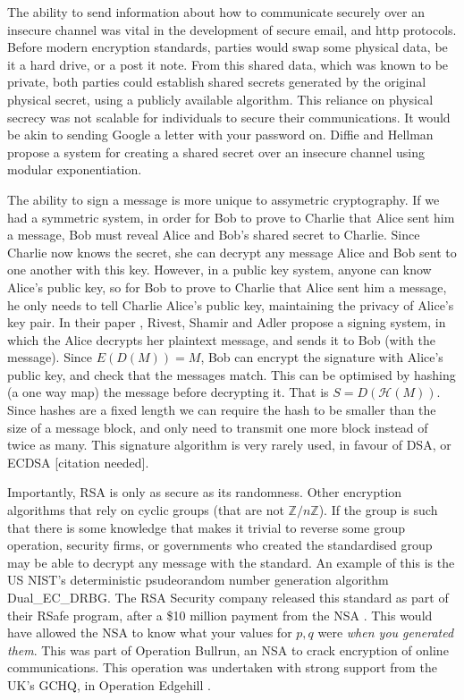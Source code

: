\documentclass{article}
\begin{document}
The ability to send information about how to communicate securely over an
insecure channel was vital in the development of secure email, and http protocols.
Before modern encryption standards, parties would swap some physical data,
be it a hard drive, or a post it note.
From this shared data, which was known to be private,
both parties could establish shared secrets generated by the original physical secret,
using a publicly available algorithm.
This reliance on physical secrecy was not scalable for individuals to secure their communications.
It would be akin to sending Google a letter with your password on.
Diffie and Hellman \cite{Directions} propose a system for creating a shared secret over an insecure channel using modular exponentiation.

The ability to sign a message is more unique to assymetric cryptography.
If we had a symmetric system, in order for Bob to prove to Charlie that Alice sent him a message,
Bob must reveal Alice and Bob's shared secret to Charlie.
Since Charlie now knows the secret, she can decrypt any message Alice and Bob sent to one another with this key.
However, in a public key system, anyone can know Alice's public key, so for Bob to prove to Charlie that Alice sent him a message,
he only needs to tell Charlie Alice's public key, maintaining the privacy of Alice's key pair.
In their paper \cite{RSA}, Rivest, Shamir and Adler propose a signing system,
in which the Alice decrypts her plaintext message, and sends it to Bob (with the message).
Since $E(D(M)) = M$, Bob can encrypt the signature with Alice's public key, and check that the messages match.
This can be optimised by hashing (a one way map) the message before decrypting it. That is $S = D(\mathcal{H}(M))$.
Since hashes are a fixed length we can require the hash to be smaller than the size of a message block,
and only need to transmit one more block instead of twice as many.
This signature algorithm is very rarely used, in favour of DSA, or ECDSA [citation needed].

Importantly, RSA is only as secure as its randomness.
Other encryption algorithms that rely on cyclic groups (that are not $\mathbb{Z}/n\mathbb{Z}$).
If the group is such that there is some knowledge that makes it trivial to reverse some group operation,
security firms, or governments who created the standardised group may be able to decrypt any message with the standard.
An example of this is the US NIST's deterministic psudeorandom number generation algorithm Dual\_EC\_DRBG.
The RSA Security company released this standard as part of their RSafe program, after a \$10 million payment from the NSA \cite{Reuters}.
This would have allowed the NSA to know what your values for $p, q$ were \emph{when you generated them}.
This was part of Operation Bullrun, an NSA to crack encryption of online communications.
This operation was undertaken with strong support from the UK's GCHQ, in Operation Edgehill \cite{Bullrun}.
\end{document}

